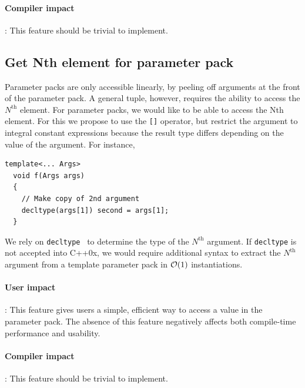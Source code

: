 \documentclass{article}
\begin{document}
\paragraph{Compiler impact}: This feature should be trivial to implement.

\subsection{Get Nth element for parameter pack}
Parameter packs are only accessible linearly, by peeling off arguments
at the front of the parameter pack. A general tuple, however, requires
the ability to access the $N^{\text{th}}$ element. For parameter
packs, we would like to be able to access the Nth element. For this we
propose to use the \texttt{[]} operator, but restrict the argument to
integral constant expressions because the result type differs
depending on the value of the argument. For instance,

\begin{verbatim}
template<... Args>
  void f(Args args)
  {
    // Make copy of 2nd argument
    decltype(args[1]) second = args[1];
  }
\end{verbatim}

We rely on \texttt{decltype}~\cite{JarviStroustrup04} to determine the
type of the $N^{\text{th}}$ argument. If \texttt{decltype} is not
accepted into C++0x, we would require additional syntax to extract the
$N^{\text{th}}$ argument from a template parameter pack in ${\cal
  O}(1)$ instantiations.

\paragraph{User impact}: This feature gives users a simple, efficient
way to access a value in the parameter pack. The absence of this
feature negatively affects both compile-time performance and usability.

\paragraph{Compiler impact}: This feature should be trivial to
implement.
\end{document}
